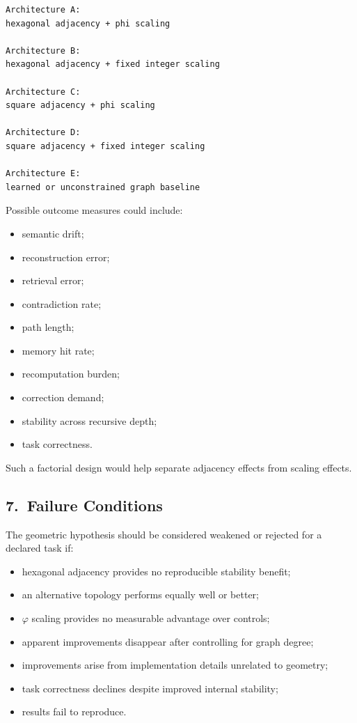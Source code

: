 \begin{verbatim}
Architecture A:
hexagonal adjacency + phi scaling

Architecture B:
hexagonal adjacency + fixed integer scaling

Architecture C:
square adjacency + phi scaling

Architecture D:
square adjacency + fixed integer scaling

Architecture E:
learned or unconstrained graph baseline
\end{verbatim}

Possible outcome measures could include:

\begin{itemize}
    \item semantic drift;
    \item reconstruction error;
    \item retrieval error;
    \item contradiction rate;
    \item path length;
    \item memory hit rate;
    \item recomputation burden;
    \item correction demand;
    \item stability across recursive depth;
    \item task correctness.
\end{itemize}

Such a factorial design would help separate adjacency effects from scaling
effects.

\subsection*{7.\ Failure Conditions}

The geometric hypothesis should be considered weakened or rejected for a
declared task if:

\begin{itemize}
    \item hexagonal adjacency provides no reproducible stability benefit;
    \item an alternative topology performs equally well or better;
    \item $\varphi$ scaling provides no measurable advantage over controls;
    \item apparent improvements disappear after controlling for graph degree;
    \item improvements arise from implementation details unrelated to geometry;
    \item task correctness declines despite improved internal stability;
    \item results fail to reproduce.
\end{itemize}

